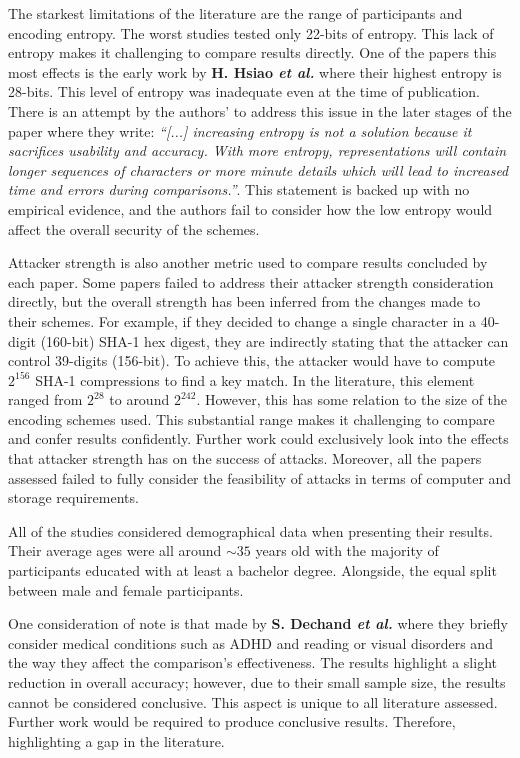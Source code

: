 The starkest limitations of the literature are the range of participants and encoding entropy. The worst studies tested only 22-bits of entropy. This lack of entropy makes it challenging to compare results directly. One of the papers this most effects is the early work by \textbf{H. Hsiao \textit{et al.}}\cite{hsiao2009study}  where their highest entropy is 28-bits. This level of entropy was inadequate even at the time of publication. There is an attempt by the authors' to address this issue in the later stages of the paper where they write: \textit{``[...] increasing entropy is not a solution because it sacrifices usability and accuracy. With more entropy, representations will contain longer sequences of characters or more minute details which will lead to increased time and errors during comparisons.''}. This statement is backed up with no empirical evidence, and the authors fail to consider how the low entropy would affect the overall security of the schemes.

Attacker strength is also another metric used to compare results concluded by each paper. Some papers failed to address their attacker strength consideration directly, but the overall strength has been inferred from the changes made to their schemes. For example, if they decided to change a single character in a 40-digit (160-bit) SHA-1 hex digest, they are indirectly stating that the attacker can control 39-digits (156-bit). To achieve this, the attacker would have to compute $2^{156}$ SHA-1 compressions to find a key match.
In the literature, this element ranged from $2^{28}$ to around $2^{242}$. However, this has some relation to the size of the encoding schemes used. This substantial range makes it challenging to compare and confer results confidently. 
Further work could exclusively look into the effects that attacker strength has on the success of attacks. Moreover, all the papers assessed failed to fully consider the feasibility of attacks in terms of computer and storage requirements. 

All of the studies considered demographical data when presenting their results. Their average ages were all around $\sim35$ years old with the majority of participants educated with at least a bachelor degree. Alongside, the equal split between male and female participants.

One consideration of note is that made by \textbf{S. Dechand \textit{et al.}}\cite{dechand2016empirical} where they briefly consider medical conditions such as ADHD and reading or visual disorders and the way they affect the comparison's effectiveness. The results highlight a slight reduction in overall accuracy; however, due to their small sample size, the results cannot be considered conclusive. This aspect is unique to all literature assessed. Further work would be required to produce conclusive results. Therefore, highlighting a gap in the literature.

